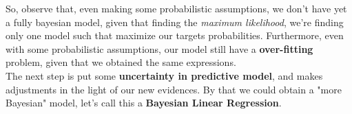 \begin{frame}{\insertsubsection}

So, observe that, even making some probabilistic assumptions, we don't have yet a fully bayesian model, given that finding the \textit{maximum likelihood}, we're finding only one model such that maximize our targets probabilities. Furthermore, even with some probabilistic assumptions, our model still have a \textbf{over-fitting} problem, given that we obtained the same expressions.\\
\vspace{1em}
The next step is put some \textbf{uncertainty in predictive model}, and makes adjustments in the light of our new evidences. By that we could obtain a "more Bayesian" model, let's call this a \textcolor{UniGold}{\textbf{Bayesian Linear Regression}}.

\end{frame}

%	

